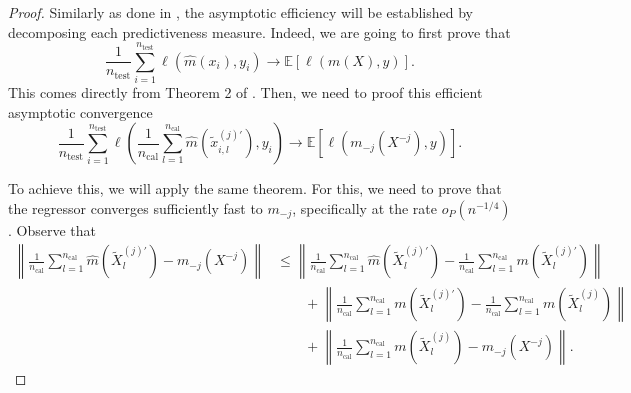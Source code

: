 \documentclass{article}
\theoremstyle{plain}
\theoremstyle{definition}
\theoremstyle{remark}
\newcommand{\e}[1]{\mathbb{E}\left[#1\right]  } %
\begin{document}
\begin{proof}
Similarly as done in \citet{williamson2023general}, the asymptotic efficiency will be established by decomposing each predictiveness measure. Indeed, we are going to first prove that $$\frac{1}{n_\mathrm{test}}\sum_{i=1}^{n_\mathrm{test}}\ell(\widehat{m}(x_i), y_i)\to\e{\ell(m(X), y)}.$$
This comes directly from Theorem 2 of \citet{williamson2023general}. Then, we need to proof this efficient asymptotic convergence $$\frac{1}{n_\mathrm{test}}\sum_{i=1}^{n_\mathrm{test}}\ell\left(\frac{1}{n_\mathrm{cal}}\sum_{l=1}^{n_\mathrm{cal}}\widehat{m}(\widetilde{x}_{i,l}^{(j)'}), y_i\right)\to\e{\ell(m_{-j}(X^{-j}), y)}.$$

To achieve this, we will apply the same theorem. For this, we need to prove that the regressor converges sufficiently fast to $m_{-j}$, specifically at the rate $o_P(n^{-1/4})$. Observe that
\begin{align*}
    \left\|\frac{1}{n_\mathrm{cal}}\sum_{l=1}^{n_\mathrm{cal}}\widehat{m}(\widetilde{X}_{l}^{(j)'})-m_{-j}(X^{-j})\right\|&\leq \left\|\frac{1}{n_\mathrm{cal}}\sum_{l=1}^{n_\mathrm{cal}}\widehat{m}(\widetilde{X}_{l}^{(j)'})-\frac{1}{n_\mathrm{cal}}\sum_{l=1}^{n_\mathrm{cal}}m(\widetilde{X}_{l}^{(j)'})\right\| \\&\qquad+ \left\|\frac{1}{n_\mathrm{cal}}\sum_{l=1}^{n_\mathrm{cal}}m(\widetilde{X}_{l}^{(j)'})-\frac{1}{n_\mathrm{cal}}\sum_{l=1}^{n_\mathrm{cal}}m(\widetilde{X}_{l}^{(j)})\right\|\\&\qquad+\left\|\frac{1}{n_\mathrm{cal}}\sum_{l=1}^{n_\mathrm{cal}}m(\widetilde{X}_{l}^{(j)})-m_{-j}(X^{-j})\right\|.
\end{align*}


\end{proof}
\end{document}
